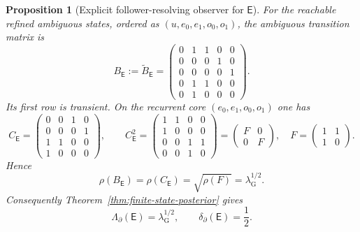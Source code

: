 \documentclass{etds}%
\numberwithin{equation}{section}
\theoremstyle{plain}
\newtheorem{proposition}[theorem]{Proposition}
\theoremstyle{definition}
\theoremstyle{remark}
\begin{document}
\begin{proposition}[Explicit follower-resolving observer for $\mathsf{E}$]
For the reachable refined ambiguous states, ordered as
$(u,e_0,e_1,o_0,o_1)$, the ambiguous transition matrix is
\[
B_{\mathsf{E}}:=\widetilde{B}_{\mathsf{E}}
=\begin{pmatrix}
0&1&1&0&0\\
0&0&0&1&0\\
0&0&0&0&1\\
0&1&1&0&0\\
0&1&0&0&0
\end{pmatrix}.
\]
Its first row is transient.  On the recurrent core $(e_0,e_1,o_0,o_1)$ one has
\[
C_{\mathsf{E}}
=\begin{pmatrix}
0&0&1&0\\
0&0&0&1\\
1&1&0&0\\
1&0&0&0
\end{pmatrix},
\qquad
C_{\mathsf{E}}^2
=\begin{pmatrix}
1&1&0&0\\
1&0&0&0\\
0&0&1&1\\
0&0&1&0
\end{pmatrix}
=\begin{pmatrix}
F&0\\
0&F
\end{pmatrix},
\quad
F=\begin{pmatrix}1&1\\ 1&0\end{pmatrix}.
\]
Hence
\[
\rho(B_{\mathsf{E}})=\rho(C_{\mathsf{E}})
=\sqrt{\rho(F)}
=\lambda_{\mathrm G}^{1/2}.
\]
Consequently Theorem~\ref{thm:finite-state-posterior} gives
\[
\Lambda_\partial(\mathsf{E})=\lambda_{\mathrm G}^{1/2},
\qquad
\delta_\partial(\mathsf{E})=\frac12.
\]
\end{proposition}
\end{document}
